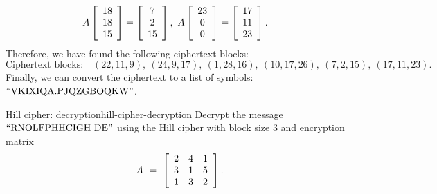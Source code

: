 \documentclass{ximera}
\begin{document}
\begin{solution}
\begin{align*}
    &A \startmat{c} 18 \\ 18 \\ 15 \stopmat
    = \startmat{c} 7 \\ 2 \\ 15 \stopmat,
    \quad
    A \startmat{c} 23 \\ 0 \\ 0 \stopmat
    = \startmat{c} 17 \\ 11 \\ 23 \stopmat.
  \end{align*}
  Therefore, we have found the following ciphertext blocks:
  \begin{equation*}
    \mbox{Ciphertext blocks:}\quad
    (22,11,9),\
    (24,9,17),\
    (1,28,16),\
    (10,17,26),\
    (7,2,15),\
    (17,11,23).
  \end{equation*}
  Finally, we can convert the ciphertext to a list of symbols:
  $\q{VKIXIQA.PJQZGBOQKW}$.
\end{solution}

\begin{example}{Hill cipher: decryption}{hill-cipher-decryption}
  Decrypt the message $\q{RNOLFPHHCIGH DE}$ using the Hill cipher with
  block size $3$ and encryption matrix
  \begin{equation*}
    A ~=~ \startmat{ccc}
      2 & 4 & 1 \\
      3 & 1 & 5 \\
      1 & 3 & 2 \\
    \stopmat.
  \end{equation*}
\end{example}
\end{document}
